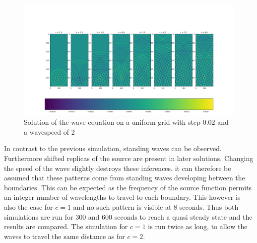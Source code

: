 \documentclass{article}
\begin{document}
\begin{figure}[H]
	\centering
	\includegraphics[width=.9\linewidth]{31.png}
	\caption{Solution of the wave equation on a uniform grid with step 0.02 and a wavespeed of 2}
	\label{fig:c2}
\end{figure}
In contrast to the previous simulation, standing waves can be observed. Furthermore shifted replicas of the source are present in later solutions. Changing the speed of the wave slightly destroys these inferences. it can therefore be assumed that these patterns come from standing waves developing between the boundaries. This can be expected as the frequency of the source function permits an integer number of wavelengths to travel to each boundary. This however is also the case for $c=1$ and no such pattern is visible at 8 seconds. Thus both simulations are run for 300 and 600 seconds to reach a quasi steady state and the results are compared. The simulation for $c=1$ is run twice as long, to allow the waves to travel the same distance as for $c=2$.
\end{document}
